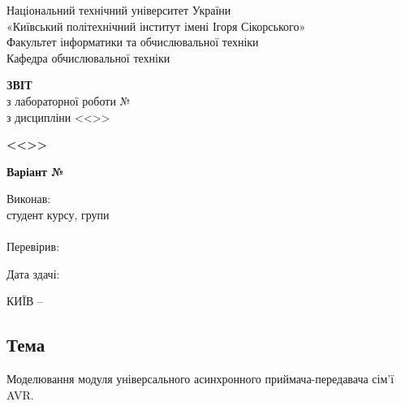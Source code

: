 \documentclass[14pt, a4paper]{extreport}
\begin{document}
	
	\begin{titlepage}
		\begin{center}
			\normalsize
			Національний технічний університет України\\
			«Київський політехнічний інститут імені Ігоря Сікорського» \\[0.5em]
			Факультет інформатики та обчислювальної техніки\\
			Кафедра обчислювальної техніки
			
			\vfill
			
			{\large \textbf{ЗВІТ}\\[0.5em]}
			{з лабораторної роботи №\LabNumber \\}
			{з дисципліни <<\CourseTitle>>}
			
			\vspace{2em}
			
			{\textbf{<<\Topic>>}}
			
			\vspace{1em}
			
			{\textbf{Варіант №\Variant}}
			
			\vfill
			
			\begin{flushright}
				Виконав: \\ студент \CourseNumber{} курсу, групи \StudentGroup \\
				\StudentName \\[1em]
				Перевірив: \\ \Teacher
			\end{flushright}
			
			\vfill
			
			\begin{flushright}
				Дата здачі: \DTMtoday
			\end{flushright}
			
			\vspace{5em}
			КИЇВ -- \ReportYear
		\end{center}
	\end{titlepage}
	
	\clearpage
	\setcounter{page}{2}
	
	\subsection*{Тема} 
	
	Моделювання модуля універсального асинхронного приймача-передавача сім’ї AVR.
	
\end{document}
